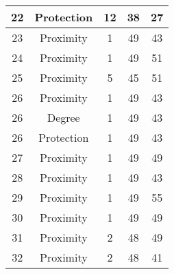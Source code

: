 \documentclass[results.tex]{subfiles}
\begin{document}
\begin{center}
\begin{tabular}{| c || c | c | c | c |}
            \hline
            22                      & Protection                   & 12                     & 38                      & 27                   \\
            \hline
            23                      & Proximity                    & 1                      & 49                      & 43                   \\
            \hline
            24                      & Proximity                    & 1                      & 49                      & 51                   \\
            \hline
            25                      & Proximity                    & 5                      & 45                      & 51                   \\
            \hline
            26                      & Proximity                    & 1                      & 49                      & 43                   \\
            \hline
            26                      & Degree                       & 1                      & 49                      & 43                   \\
            \hline
            26                      & Protection                   & 1                      & 49                      & 43                   \\
            \hline
            27                      & Proximity                    & 1                      & 49                      & 49                   \\
            \hline
            28                      & Proximity                    & 1                      & 49                      & 43                   \\
            \hline
            29                      & Proximity                    & 1                      & 49                      & 55                   \\
            \hline
            30                      & Proximity                    & 1                      & 49                      & 49                   \\
            \hline
            31                      & Proximity                    & 2                      & 48                      & 49                   \\
            \hline
            32                      & Proximity                    & 2                      & 48                      & 41                   \\

\end{tabular}
\end{center}
\end{document}
